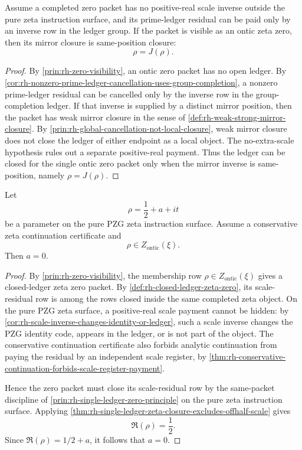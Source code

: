 \begin{theorem}
\label{thm:rh-same-position-mirror-closure-ontic-zero}
Assume a completed zero packet has no positive-real scale inverse outside
the pure zeta instruction surface, and its prime-ledger residual can be
paid only by an inverse row in the ledger group.  If the packet is visible
as an ontic zeta zero, then its mirror closure is same-position closure:
$$
\rho=J(\rho).
$$
\end{theorem}

\begin{proof}
By \autoref{prin:rh-zero-visibility}, an ontic zero packet has no open
ledger.  By
\autoref{cor:rh-nonzero-prime-ledger-cancellation-uses-group-completion},
a nonzero prime-ledger residual can be cancelled only by the inverse row
in the group-completion ledger.  If that inverse is supplied by a
distinct mirror position, then the packet has weak mirror closure in the
sense of \autoref{def:rh-weak-strong-mirror-closure}.  By
\autoref{prin:rh-global-cancellation-not-local-closure}, weak mirror
closure does not close the ledger of either endpoint as a local object.
The no-extra-scale hypothesis rules out a separate positive-real payment.
Thus the ledger can be closed for the single ontic zero packet only when
the mirror inverse is same-position, namely $\rho=J(\rho)$.
\end{proof}

\begin{theorem}
\label{thm:rh-pzg-closed-zero-fixed-half}
Let
$$
\rho=\frac12+a+it
$$
be a parameter on the pure PZG zeta instruction surface.  Assume a
conservative zeta continuation certificate and
$$
\rho\in Z_{\mathrm{ontic}}(\xi).
$$
Then $a=0$.
\end{theorem}

\begin{proof}
By \autoref{prin:rh-zero-visibility}, the membership row
$\rho\in Z_{\mathrm{ontic}}(\xi)$ gives a closed-ledger zeta zero packet.
By \autoref{def:rh-closed-ledger-zeta-zero}, its scale-residual row is
among the rows closed inside the same completed zeta object.  On the pure
PZG zeta surface, a positive-real scale payment cannot be hidden: by
\autoref{cor:rh-scale-inverse-changes-identity-or-ledger}, such a scale
inverse changes the PZG identity code, appears in the ledger, or is not
part of the object.  The conservative continuation certificate also
forbids analytic continuation from paying the residual by an independent
scale register, by
\autoref{thm:rh-conservative-continuation-forbids-scale-register-payment}.

Hence the zero packet must close its scale-residual row by the
same-packet discipline of \autoref{prin:rh-single-ledger-zero-principle}
on the pure zeta instruction surface.  Applying
\autoref{thm:rh-single-ledger-zeta-closure-excludes-offhalf-scale} gives
$$
\Re(\rho)=\frac12.
$$
Since $\Re(\rho)=1/2+a$, it follows that $a=0$.
\end{proof}

